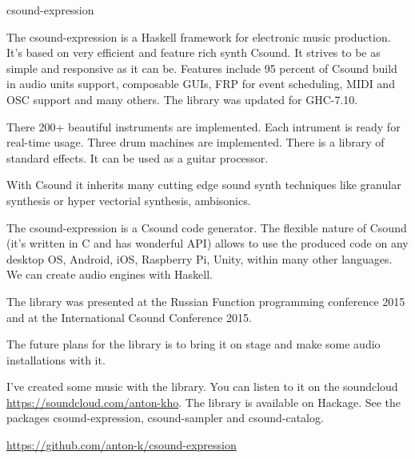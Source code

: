 \begin{hcarentry}[updated]{csound-expression}
\makeheader

The csound-expression is a Haskell framework for electronic music production.
It's based on very efficient and feature rich synth Csound.
It strives to be as simple and responsive as it can be.
Features include 95 percent of Csound build in audio units support,
composable GUIs, FRP for event scheduling, MIDI and OSC support and many others.
The library was updated for GHC-7.10.

There 200+ beautiful instruments are implemented. 
Each intrument is ready for real-time usage. Three drum machines are implemented.
There is a library of standard effects. It can be used as a guitar processor.

With Csound it inherits many cutting edge sound synth techniques like
granular synthesis or hyper vectorial synthesis, ambisonics.

The csound-expression is a Csound code generator. The flexible nature of Csound 
(it's written in C and has wonderful API)  allows to use the produced 
code on any desktop OS, Android, iOS, Raspberry Pi, Unity, within many other languages.
We can create audio engines with Haskell.

The library was presented at the Russian Function programming conference 2015
and at the International Csound Conference 2015. 

The future plans for the library is to bring it on stage and make 
some audio installations with it.

I've created some music with the library. You can listen to it 
on the soundcloud \url{https://soundcloud.com/anton-kho}.
The library is available on Hackage.
See the packages csound-expression, csound-sampler and csound-catalog.

\FurtherReading
  \url{https://github.com/anton-k/csound-expression}
\end{hcarentry}
